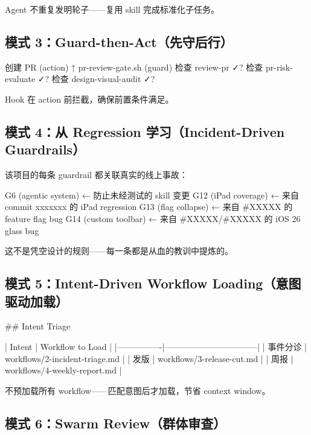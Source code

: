 Agent 不重复发明轮子------复用 skill 完成标准化子任务。


\subsection{模式 3：Guard-then-Act（先守后行）}

\begin{codeblock}
创建 PR (action)
    ↑
pr-review-gate.sh (guard)
    检查 review-pr ✓?
    检查 pr-risk-evaluate ✓?
    检查 design-visual-audit ✓?
\end{codeblock}

Hook 在 action 前拦截，确保前置条件满足。


\subsection{模式 4：从 Regression 学习（Incident-Driven Guardrails）}

该项目的每条 guardrail 都关联真实的线上事故：


\begin{codeblock}
G6  (agentic system)   ← 防止未经测试的 skill 变更
G12 (iPad coverage)    ← 来自 commit xxxxxxx 的 iPad regression
G13 (flag collapse)    ← 来自 #XXXXX 的 feature flag bug
G14 (custom toolbar)   ← 来自 #XXXXX/#XXXXX 的 iOS 26 glass bug
\end{codeblock}

这不是凭空设计的规则------每一条都是从血的教训中提炼的。


\subsection{模式 5：Intent-Driven Workflow Loading（意图驱动加载）}

\begin{codeblock}
## Intent Triage

| Intent         | Workflow to Load                |
|----------------|---------------------------------|
| 事件分诊       | workflows/2-incident-triage.md  |
| 发版           | workflows/3-release-cut.md      |
| 周报           | workflows/4-weekly-report.md    |
\end{codeblock}

不预加载所有 workflow------匹配意图后才加载，节省 context window。


\subsection{模式 6：Swarm Review（群体审查）}

